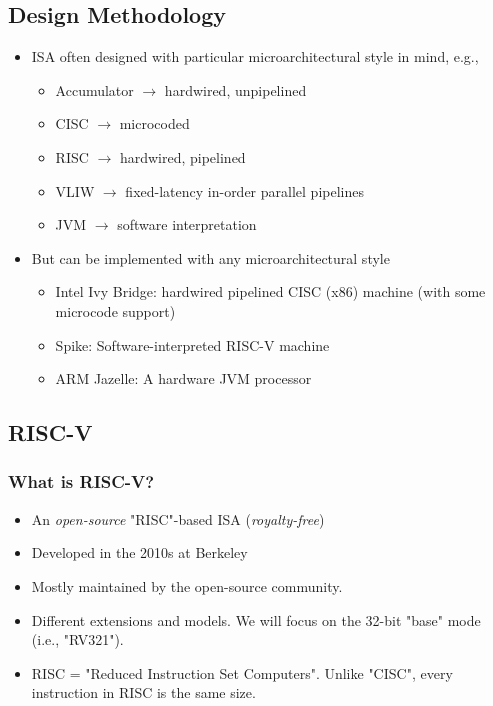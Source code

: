 \documentclass[10pt]{article}
\begin{document}
\subsection*{Design Methodology}
\begin{itemize}
    \item ISA often designed with particular microarchitectural style in mind, e.g., 
    \begin{itemize}
        \item Accumulator $\rightarrow$ hardwired, unpipelined
        \item CISC $\rightarrow$ microcoded
        \item RISC $\rightarrow$ hardwired, pipelined
        \item VLIW $\rightarrow$ fixed-latency in-order parallel pipelines
        \item JVM $\rightarrow$ software interpretation
    \end{itemize}
    \item But can be implemented with any microarchitectural style
    \begin{itemize}
        \item Intel Ivy Bridge: hardwired pipelined CISC (x86) machine (with some microcode support)
        \item Spike: Software-interpreted RISC-V machine
        \item ARM Jazelle: A hardware JVM processor
    \end{itemize}
\end{itemize}
\subsection*{RISC-V}
\subsubsection*{What is RISC-V?}
\begin{itemize}
    \item An \textit{open-source} "RISC"-based ISA (\textit{royalty-free})
    \item Developed in the 2010s at Berkeley
    \item Mostly maintained by the open-source community.
    \item Different extensions and models.  We will focus on the 32-bit "base" mode (i.e., "RV321").
    \item RISC = "Reduced Instruction Set Computers".  Unlike "CISC", every instruction in RISC is the same size.
\end{itemize}
\end{document}

